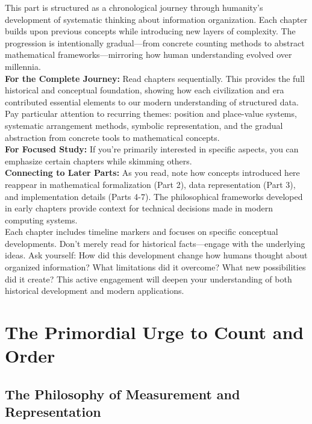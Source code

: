 \documentclass[12pt, oneside, openany]{book}
\begin{document}
This part is structured as a chronological journey through humanity's development of systematic thinking about information organization. Each chapter builds upon previous concepts while introducing new layers of complexity. The progression is intentionally gradual—from concrete counting methods to abstract mathematical frameworks—mirroring how human understanding evolved over millennia.\\
\textbf{For the Complete Journey:} Read chapters sequentially. This provides the full historical and conceptual foundation, showing how each civilization and era contributed essential elements to our modern understanding of structured data. Pay particular attention to recurring themes: position and place-value systems, systematic arrangement methods, symbolic representation, and the gradual abstraction from concrete tools to mathematical concepts.\\
\textbf{For Focused Study:} If you're primarily interested in specific aspects, you can emphasize certain chapters while skimming others.\\
\textbf{Connecting to Later Parts:} As you read, note how concepts introduced here reappear in mathematical formalization (Part 2), data representation (Part 3), and implementation details (Parts 4-7). The philosophical frameworks developed in early chapters provide context for technical decisions made in modern computing systems.\\
Each chapter includes timeline markers and focuses on specific conceptual developments. Don't merely read for historical facts—engage with the underlying ideas. Ask yourself: How did this development change how humans thought about organized information? What limitations did it overcome? What new possibilities did it create? This active engagement will deepen your understanding of both historical development and modern applications.


\chapter{The Primordial Urge to Count and Order}

\section{The Philosophy of Measurement and Representation}
\end{document}
